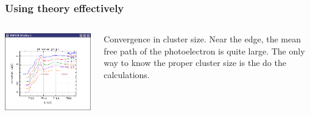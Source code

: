 \documentclass[10pt, xcolor=x11names, compress]{beamer}
\begin{document}
\begin{frame}
  \frametitle{Using theory effectively}
  \begin{columns}
    \begin{column}{0.4\linewidth}
      \begin{center}
        \includegraphics[width=0.9\linewidth]{images/xanes_convergence.png}
      \end{center}
    \end{column}
    \begin{column}{0.6\linewidth}
      Convergence in cluster size.  Near the edge, the mean free path
      of the photoelectron is quite large.  The only way to know the
      proper cluster size is the do the calculations.
    \end{column}
  \end{columns}


\end{frame}
\end{document}
